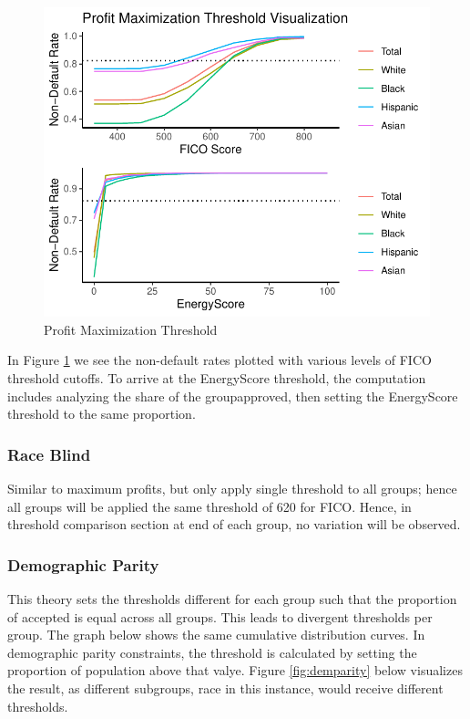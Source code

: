 \documentclass[11pt,]{article}
\begin{document}
\begin{figure}
\centering
\includegraphics{figs/profitmax.pdf}
\caption{\label{fig:profitmax}Profit Maximization Threshold}
\end{figure}

In Figure \ref{fig:profitmax} we see the non-default rates plotted with
various levels of FICO threshold cutoffs. To arrive at the EnergyScore
threshold, the computation includes analyzing the share of the
groupapproved, then setting the EnergyScore threshold to the same
proportion.

\hypertarget{race-blind}{%
\subsubsection{Race Blind}\label{race-blind}}

Similar to maximum profits, but only apply single threshold to all
groups; hence all groups will be applied the same threshold of 620 for
FICO. Hence, in threshold comparison section at end of each group, no
variation will be observed.

\hypertarget{demographic-parity}{%
\subsubsection{Demographic Parity}\label{demographic-parity}}

This theory sets the thresholds different for each group such that the
proportion of accepted is equal across all groups. This leads to
divergent thresholds per group. The graph below shows the same
cumulative distribution curves. In demographic parity constraints, the
threshold is calculated by setting the proportion of population above
that valye. Figure \ref{fig:demparity} below visualizes the result, as
different subgroups, race in this instance, would receive different
thresholds.
\end{document}
